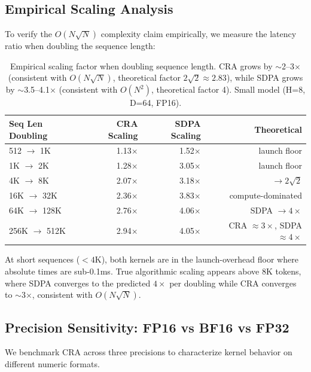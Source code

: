 \documentclass{article}
\begin{document}
    \subsection{Empirical Scaling Analysis}

    To verify the $O(N\sqrt{N})$ complexity claim empirically, we measure the latency ratio when doubling the sequence length:

    \begin{table}[h]
    \centering
    \caption{Empirical scaling factor when doubling sequence length. CRA grows by $\sim$2--3$\times$ (consistent with $O(N\sqrt{N})$, theoretical factor $2\sqrt{2} \approx 2.83$), while SDPA grows by $\sim$3.5--4.1$\times$ (consistent with $O(N^2)$, theoretical factor 4). Small model (H=8, D=64, FP16).}
    \begin{tabular}{lrrr}
    \toprule
    Seq Len Doubling & CRA Scaling & SDPA Scaling & Theoretical \\
    \midrule
    512 $\to$ 1K & 1.13$\times$ & 1.52$\times$ & launch floor \\
    1K $\to$ 2K & 1.28$\times$ & 3.05$\times$ & launch floor \\
    4K $\to$ 8K & 2.07$\times$ & 3.18$\times$ & $\to 2\sqrt{2}$ \\
    16K $\to$ 32K & 2.36$\times$ & 3.83$\times$ & compute-dominated \\
    64K $\to$ 128K & 2.76$\times$ & 4.06$\times$ & SDPA $\to 4\times$ \\
    256K $\to$ 512K & 2.94$\times$ & 4.05$\times$ & CRA $\approx 3\times$, SDPA $\approx 4\times$ \\
    \bottomrule
    \end{tabular}
    \label{tab:scaling}
    \end{table}

    At short sequences ($< 4$K), both kernels are in the launch-overhead floor where absolute times are sub-0.1ms. True algorithmic scaling appears above 8K tokens, where SDPA converges to the predicted $4\times$ per doubling while CRA converges to $\sim$3$\times$, consistent with $O(N\sqrt{N})$.

    \subsection{Precision Sensitivity: FP16 vs BF16 vs FP32}
    \label{sec:precision}

    We benchmark CRA across three precisions to characterize kernel behavior on different numeric formats.
\end{document}
